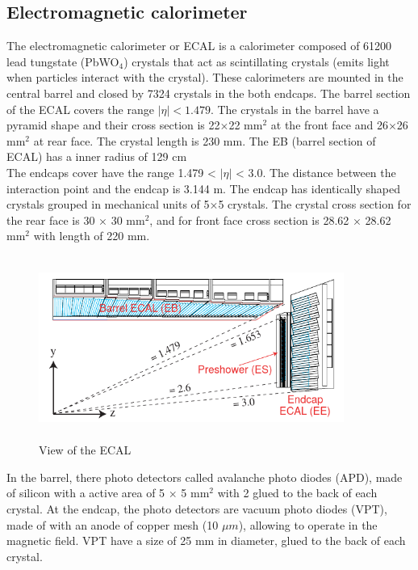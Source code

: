 \subsection{Electromagnetic calorimeter}

The electromagnetic calorimeter or ECAL is a calorimeter composed of 61200 lead tungstate (PbWO$_4$) crystals that act as scintillating crystals (emits light when particles interact with the crystal). These calorimeters are mounted in the central barrel and closed by 7324 crystals in the both endcaps. The barrel section of the ECAL covers the range $|\eta| < 1.479$. The crystals in the barrel have a pyramid shape and their cross section is 22$\times$22 mm$^2$ at the front face and 26$\times$26 mm$^2$ at rear face. The crystal length is 230 mm. The EB (barrel section of ECAL) has a inner radius of 129 cm\cite{cms-manual}\\

The endcaps cover have the range 1.479 < $|\eta|$ < 3.0. The distance between the interaction point and the endcap is 3.144 m. The endcap has identically shaped crystals grouped in
mechanical units of 5×5 crystals. The crystal cross section for the rear face is 30 $\times$ 30 mm$^2$, and for front face cross section is 28.62 $\times$ 28.62 mm$^2$ with length of 220 mm.
\\
\begin{figure}[!htbp]
	\centering
	\includegraphics[width=10cm,height=6cm]{Chapter2/ecal.png}
	\caption{View of the ECAL\cite{cms-manual}}\label{ecal}
\end{figure}
In the barrel, there photo detectors called avalanche photo diodes (APD), made of silicon with a active area of 5 $\times$ 5 mm$^2$ with 2 glued to the back of each crystal. At the endcap, the photo detectors are vacuum photo diodes (VPT), made of with an anode of copper mesh (10 $\mu m$), allowing to operate in the magnetic field. VPT have a size of 25 mm in diameter, glued to the back of each crystal.\\


